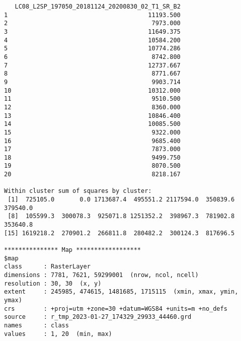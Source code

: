 \begin{scriptsize}
\begin{verbatim}
   LC08_L2SP_197050_20181124_20200830_02_T1_SR_B2
1                                       11193.500
2                                        7973.000
3                                       11649.375
4                                       10584.200
5                                       10774.286
6                                        8742.800
7                                       12737.667
8                                        8771.667
9                                        9903.714
10                                      10312.000
11                                       9510.500
12                                       8360.000
13                                      10846.400
14                                      10085.500
15                                       9322.000
16                                       9685.400
17                                       7873.000
18                                       9499.750
19                                       8070.500
20                                       8218.167

Within cluster sum of squares by cluster:
 [1]  725105.0       0.0 1713687.4  495551.2 2117594.0  350839.6  379540.0
 [8]  105599.3  300078.3  925071.8 1251352.2  398967.3  781902.8  353640.8
[15] 1619218.2  270901.2  266811.8  280482.2  300124.3  817696.5

*************** Map ******************
$map
class      : RasterLayer 
dimensions : 7781, 7621, 59299001  (nrow, ncol, ncell)
resolution : 30, 30  (x, y)
extent     : 245985, 474615, 1481685, 1715115  (xmin, xmax, ymin, ymax)
crs        : +proj=utm +zone=30 +datum=WGS84 +units=m +no_defs 
source     : r_tmp_2023-01-27_174329_29933_44460.grd 
names      : class 
values     : 1, 20  (min, max)
\end{verbatim}
\end{scriptsize}